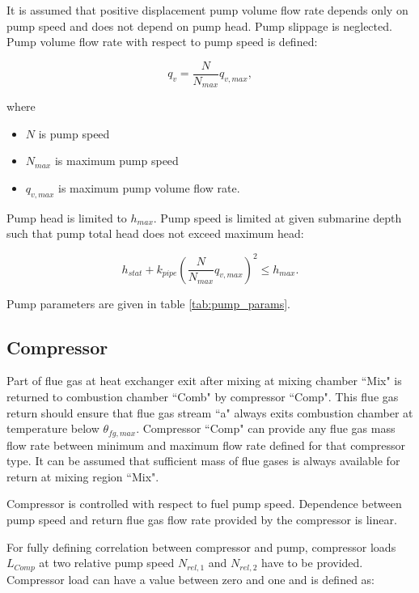 \documentclass{article}
\begin{document}
	\noindent
	It is assumed that positive displacement pump volume flow rate depends only on pump speed and does not depend on pump head. Pump slippage is neglected. Pump volume flow rate with respect to pump speed is defined:
	
	\begin{equation}\label{eq:pump_vol_flow}
		q_v = \frac{N}{N_{max}} q_{v,max},
	\end{equation}
	
	\noindent
	where
	
	\begin{itemize}
		\item $N$ is pump speed
		\item $N_{max}$ is maximum pump speed
		\item $q_{v,max}$ is maximum pump volume flow rate.
	\end{itemize}

	\noindent
	Pump head is limited to $h_{max}$. Pump speed is limited at given submarine depth such that pump total head does not exceed maximum head:
	
	\begin{equation}\label{eq:total_head_limit}
		h_{stat} + k_{pipe} \left( \frac{N}{N_{max}} q_{v,max} \right)^2 \leq h_{max}.
	\end{equation}
	
	\noindent
	Pump parameters are given in table \ref{tab:pump_params}.
	
	\subsection*{Compressor}
	
	Part of flue gas at heat exchanger exit after mixing at mixing chamber “Mix" is returned to combustion chamber “Comb" by compressor “Comp". This flue gas return should ensure that flue gas stream “a" always exits combustion chamber at temperature below $\theta_{fg,max}$. Compressor “Comp" can provide any flue gas mass flow rate between minimum and maximum flow rate defined for that compressor type. It can be assumed that sufficient mass of flue gases is always available for return at mixing region “Mix".
	
	Compressor is controlled with respect to fuel pump speed.  Dependence between pump speed and return flue gas flow rate provided by the compressor is linear. 
	
	For fully defining correlation between compressor and pump, compressor loads $L_{Comp}$ at two relative pump speed $N_{rel,1}$ and $N_{rel,2}$ have to be provided. Compressor load can have a value between zero and one and is defined as:
	
\end{document}
